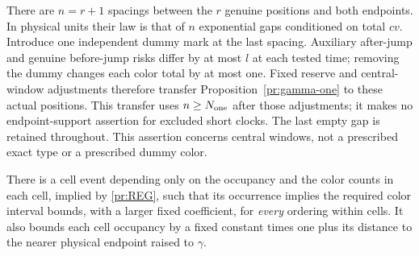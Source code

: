 There are $n=r+1$ spacings between the $r$ genuine positions and both
endpoints. In physical units their law is that of $n$ exponential gaps
conditioned on total $cv$. Introduce one independent dummy mark at the
last spacing. Auxiliary after-jump and genuine before-jump risks differ
by at most $l$ at each tested time; removing the dummy changes each
color total by at most one. Fixed reserve and central-window adjustments
therefore transfer Proposition~\ref{pr:gamma-one} to these actual positions.
This transfer uses $n\ge N_{\rm one}$ after those adjustments;
it makes no endpoint-support assertion for excluded short clocks.
The last empty gap is retained throughout. This assertion concerns
central windows, not a prescribed exact type or a prescribed dummy color.

\begin{lemma}\label{pr:cellREG}
There is a cell event depending only on the occupancy and the color
counts in each cell, implied by \eqref{pr:REG}, such that its occurrence
implies the required color interval bounds, with a larger fixed
coefficient, for \emph{every} ordering within cells. It also bounds each
cell occupancy by a fixed constant times one plus its distance to the
nearer physical endpoint raised to $\gamma$.
\end{lemma}
